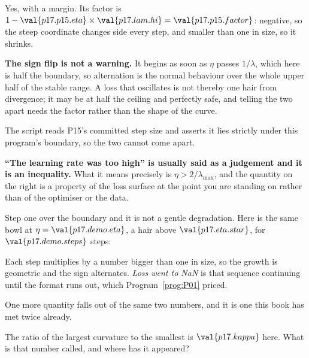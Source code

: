 \begin{fr}
\begin{ansblock}
Yes, with a margin. Its factor is
$1 - \val{p17.p15.eta} \times \val{p17.lam.hi} =
\val{p17.p15.factor}$: negative, so the steep coordinate changes side every
step, and smaller than one in size, so it shrinks.
\end{ansblock}

\textbf{The sign flip is not a warning.} It begins as soon as $\eta$ passes
$1/\lambda$, which here is half the boundary, so alternation is the normal
behaviour over the whole upper half of the stable range. A loss that
oscillates is not thereby one hair from divergence; it may be at half the
ceiling and perfectly safe, and telling the two apart needs the factor rather
than the shape of the curve.

The script reads P15's committed step size and asserts it lies strictly under
this program's boundary, so the two cannot come apart.

\begin{trapbox}
\textbf{\enquote{The learning rate was too high} is usually said as a
judgement and it is an inequality.} What it means precisely is
$\eta > 2/\lambda_{\max}$, and the quantity on the right is a property of the
loss surface at the point you are standing on rather than of the optimiser or
the data.

Step one over the boundary and it is not a gentle degradation. Here is the
same bowl at $\eta = \val{p17.demo.eta}$, a hair above
$\val{p17.eta.star}$, for $\val{p17.demo.steps}$ steps:


Each step multiplies by a number bigger than one in size, so the growth is
geometric and the sign alternates. \emph{Loss went to NaN} is that sequence
continuing until the format runs out, which Program~\ref{prog:P01} priced.
\end{trapbox}
\end{fr}

\begin{fr}
One more quantity falls out of the same two numbers, and it is one this book
has met twice already.

The ratio of the largest curvature to the smallest is
$\val{p17.kappa}$ here. What is that number called, and where has it appeared?
\dotline
\nextframe
\end{fr}


